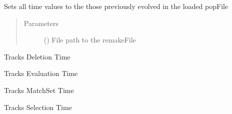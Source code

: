 \documentclass[letterpaper,10pt,english]{sphinxmanual}
\begin{document}
\begin{fulllineitems}
\begin{fulllineitems}
\end{fulllineitems}


\begin{fulllineitems}
\label{\detokenize{eLCS:eLCS.Timer.Timer.setTimerRestart}}
Sets all time values to the those previously evolved in the loaded popFile
\begin{quote}\begin{description}
\item[{Parameters}] \leavevmode
{} () \textendash{} File path to the remakeFile

\end{description}\end{quote}

\end{fulllineitems}


\begin{fulllineitems}
\label{\detokenize{eLCS:eLCS.Timer.Timer.startTimeDeletion}}
Tracks Deletion Time

\end{fulllineitems}


\begin{fulllineitems}
\label{\detokenize{eLCS:eLCS.Timer.Timer.startTimeEvaluation}}
Tracks Evaluation Time

\end{fulllineitems}


\begin{fulllineitems}
\label{\detokenize{eLCS:eLCS.Timer.Timer.startTimeMatching}}
Tracks MatchSet Time

\end{fulllineitems}


\begin{fulllineitems}
\label{\detokenize{eLCS:eLCS.Timer.Timer.startTimeSelection}}
Tracks Selection Time


\end{fulllineitems}
\end{fulllineitems}
\end{document}
